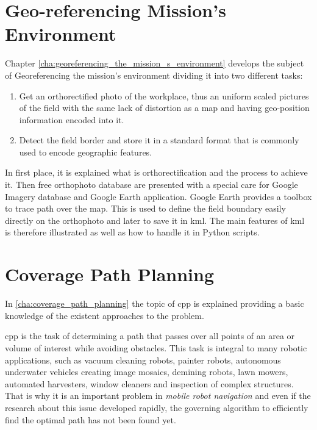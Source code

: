 \section{Geo-referencing Mission's Environment} %
\label{sec:geo_referencing_mission_s_environment}
Chapter \ref{cha:georeferencing_the_mission_s_environment} develops the subject of Georeferencing the mission's environment dividing it into two different tasks: 
\begin{enumerate}
  \item Get an orthorectified photo of the workplace, thus an uniform scaled pictures of the field with the same lack of distortion as a map and having geo-position information encoded into it.
  \item Detect the field border and store it in a standard format that is commonly used to encode geographic features.
\end{enumerate}
In first place, it is explained what is orthorectification and the process to achieve it. Then free orthophoto database are presented with a special care for Google Imagery database and Google Earth application.
Google Earth provides a toolbox to trace path over the map. This is used to define the field boundary easily directly on the orthophoto and later to save it in \acrfull{kml}. The main features of \acrshort{kml} is therefore illustrated as well as how to handle it in Python scripts.


\section{Coverage Path Planning} %
\label{sec:coverage_path_planning}
In \autoref{cha:coverage_path_planning} the topic of \acrfull{cpp} is explained providing a basic knowledge of the existent approaches to the problem.\par
\acrlong{cpp} is the task of determining a path that passes over all points of an area or volume of interest while avoiding obstacles. This task is integral to many robotic applications, such as vacuum cleaning robots, painter robots, autonomous underwater vehicles creating image mosaics, demining robots, lawn mowers, automated harvesters, window cleaners and inspection of complex structures. That is why it is an important problem in \textit{mobile robot navigation} and even if the research about this issue developed rapidly, the governing algorithm to efficiently find the optimal path has not been found yet.



